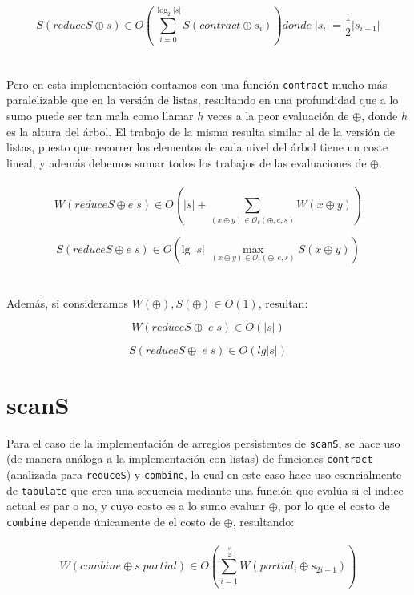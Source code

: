 \documentclass[a4paper,10pt]{article}
\begin{document}
	\begin{equation*}
		S \left( reduceS \oplus s \right) \in O \left(\sum_{i=0}^{\log_2 \vert s \vert} S \left( contract \oplus s_i \right) \right) donde \; \vert s_i\vert = \frac{1}{2} \vert s_{i-1} \vert
	\end{equation*}
\\
\\
	Pero en esta implementación contamos con una función \texttt{contract} mucho más paralelizable que en la versión de listas, resultando en una profundidad que a lo sumo puede ser tan mala como llamar $h$ veces a la peor evaluación de $\oplus$, donde $h$ es la altura del árbol. El trabajo de la misma resulta similar al de la versión de listas, puesto que recorrer los elementos de cada nivel del árbol tiene un coste lineal, y además debemos sumar todos los trabajos de las evaluaciones de $\oplus$.
\\
\\
		\begin{equation*}
			W \left( reduceS \oplus e \; s \right) \in
			O \left( \vert s \vert + \sum_{(x \oplus y) \in \mathcal{O}_r(\oplus,e,s)} W \left( x \oplus y \right) \right)
		\end{equation*}

		\begin{equation*}
			S \left( reduceS \oplus e \; s \right) \in
			O \left( \text{lg} \; \vert s \vert \; \max_{(x \oplus y) \in \mathcal{O}_r(\oplus,e,s)} S \left( x \oplus y \right) \right)
		\end{equation*}
\\
\\
		Además, si consideramos $W(\oplus), S(\oplus) \in O(1)$, resultan:
	
		\begin{equation*}
			W \left( reduceS \oplus \; e \; s \right) \in O \left( \vert s \vert \right)
		\end{equation*}
		
		\begin{equation*}
			S \left( reduceS \oplus \; e \; s \right) \in O \left( lg \vert s \vert \right)
		\end{equation*}

\pagebreak
	\section*{\Large scanS}
		Para el caso de la implementación de arreglos persistentes de \texttt{scanS}, se hace uso (de manera análoga a la implementación con listas) de funciones \texttt{contract} (analizada para \texttt{reduceS}) y \texttt{combine}, la cual en este caso hace uso esencialmente de \texttt{tabulate} que crea una secuencia mediante una función que evalúa si el indice actual es par o no, y cuyo costo es a lo sumo evaluar $\oplus$, por lo que el costo de \texttt{combine} depende únicamente de el costo de $\oplus$, resultando:
\\
\\
\begin{equation*}
    W \left( combine \oplus s \; partial \right) \in
    O \left( \sum_{i=1}^{\frac{\vert s \vert}{2}} W \left( partial_{i} \oplus s_{2i-1} \right) \right)
\end{equation*}
\end{document}

